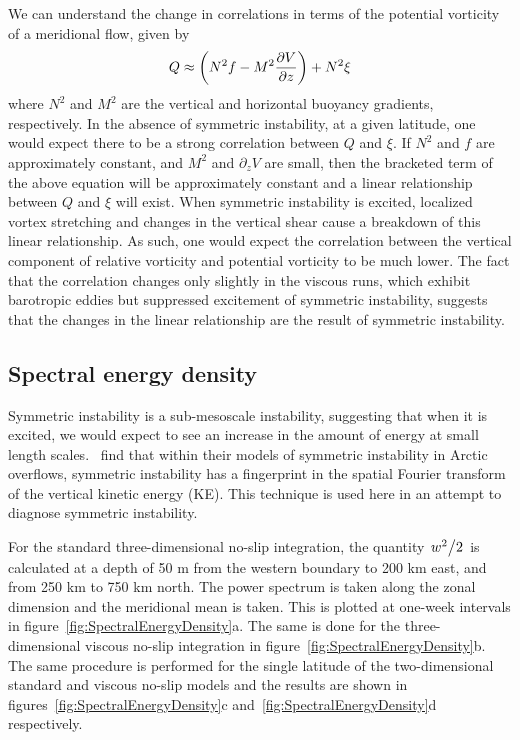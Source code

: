 We can understand the change in correlations in terms of the potential vorticity of a meridional flow, given by
\begin{equation}
    Q \approx \bigg(N^2 f - M^2 \pdv{V}{z} \bigg) + N^2 \xi
\end{equation}
where $N^2$ and $M^2$ are the vertical and horizontal buoyancy gradients, respectively. In the absence of symmetric instability, at a given latitude, one would expect there to be a strong correlation between $Q$ and $\xi$. If $N^2$ and $f$ are approximately constant, and $M^2$ and $\partial_z V$ are small, then the bracketed term of the above equation will be approximately constant and a linear relationship between $Q$ and $\xi$ will exist. When symmetric instability is excited, localized vortex stretching and changes in the vertical shear cause a breakdown of this linear relationship. As such, one would expect the correlation between the vertical component of relative vorticity and potential vorticity to be much lower. The fact that the correlation changes only slightly in the viscous runs, which exhibit barotropic eddies but suppressed excitement of symmetric instability, suggests that the changes in the linear relationship are the result of symmetric instability.

\subsection{Spectral energy density}
Symmetric instability is a sub-mesoscale instability, suggesting that when it is excited, we would expect to see an increase in the amount of energy at small length scales.~\citet{Yankovsky2019} find that within their models of symmetric instability in Arctic overflows, symmetric instability has a fingerprint in the spatial Fourier transform of the vertical kinetic energy (KE). This technique is used here in an attempt to diagnose symmetric instability.

For the standard three-dimensional no-slip integration, the quantity $\flatfrac{w^2}{2}$ is calculated at a depth of 50 m from the western boundary to 200 km east, and from 250 km to 750 km north. The power spectrum is taken along the zonal dimension and the meridional mean is taken. This is plotted at one-week intervals in figure~\ref{fig:SpectralEnergyDensity}a. The same is done for the three-dimensional viscous no-slip integration in figure~\ref{fig:SpectralEnergyDensity}b. The same procedure is performed for the single latitude of the two-dimensional standard and viscous no-slip models and the results are shown in figures~\ref{fig:SpectralEnergyDensity}c and~\ref{fig:SpectralEnergyDensity}d respectively.

